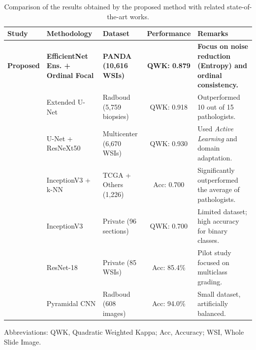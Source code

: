 \begin{table}[!t]
	\centering
	\begin{tabular*}{\textwidth}{@{\extracolsep\fill}lllc p{5cm}@{}}
		\toprule
		\textbf{Study} & \textbf{Methodology} & \textbf{Dataset} & \textbf{Performance} & \textbf{Remarks} \\
		\midrule
		\textbf{Proposed} & \textbf{EfficientNet Ens. + Ordinal Focal} & \textbf{PANDA (10,616 WSIs)} & \textbf{QWK: 0.879} & \textbf{Focus on noise reduction (Entropy) and ordinal consistency.} \\
		\midrule
		\cite{ref-bulten2020} & Extended U-Net & Radboud (5,759 biopsies) & QWK: 0.918 & Outperformed 10 out of 15 pathologists. \\
		\cite{ref-singhal2022} & U-Net + ResNeXt50 & Multicenter (6,670 WSIs) & QWK: 0.930 & Used \textit{Active Learning} and domain adaptation. \\
		\cite{ref-nagpal2019} & InceptionV3 + k-NN & TCGA + Others (1,226) & Acc: 0.700 & Significantly outperformed the average of pathologists. \\
		\cite{ref-lucas2019} & InceptionV3 & Private (96 sections) & QWK: 0.700 & Limited dataset; high accuracy for binary classes. \\
		\cite{ref-kott2019} & ResNet-18 & Private (85 WSIs) & Acc: 85.4\% & Pilot study focused on multiclass grading. \\
		\cite{ref-hammouda2021} & Pyramidal CNN & Radboud (608 images) & Acc: 94.0\% & Small dataset, artificially balanced. \\
		\bottomrule
	\end{tabular*}
	\begin{tablenotes}
		\item Abbreviations: QWK, Quadratic Weighted Kappa; Acc, Accuracy; WSI, Whole Slide Image.
	\end{tablenotes}
	\caption{Comparison of the results obtained by the proposed method with related state-of-the-art works.\label{tab:comparison-results}}
\end{table}
